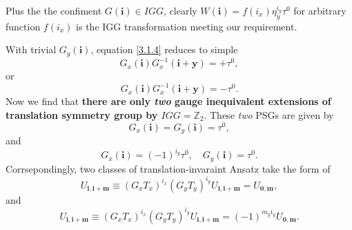 \documentclass[10pt,nofootinbib]{revtex4}
\begin{document}
		Plus the the confiment $G(\bm{i})\in IGG$, clearly $W(\bm{i})=f(i_x)\eta_y^{i_y}\tau^0$ for arbitrary function $f(i_x)$ is the IGG transformation meeting our requirement.\par
		With trivial $G_y(\bm{i})$, equation \eqref{3.1.4} reduces to simple
		\begin{equation*}
			G_x(\bm{i})G_x^{-1}(\bm{i+y})=+\tau^0,
		\end{equation*}
		or
		\begin{equation*}
			G_x(\bm{i})G_x^{-1}(\bm{i+y})=-\tau^0.
		\end{equation*}
		Now we find that \textbf{there are only \emph{two} gauge inequivalent extensions of translation symmetry group by $IGG=\mathbb{Z}_2$}. These \emph{two} PSGs are given by
		\begin{equation}\label{3.1.6}
			G_x(\bm{i})=G_y(\bm{i})=\tau^0,
		\end{equation}
		and
		\begin{equation}\label{3.1.7}
			G_x(\bm{i})=(-1)^{i_y}\tau^0,\quad G_y(\bm{i})=\tau^0.
		\end{equation}
		\indent Corrsepondingly, two classes of translation-invaraint Ansatz take the form of
		\begin{equation}\label{3.1.8}
			U_{\bm{i,i+m}}\equiv(G_xT_x)^{i_x}(G_yT_y)^{i_y}U_{\bm{i,i+m}}= U_{\bm{0,m}},
		\end{equation}
		and
		\begin{equation}\label{3.1.9}
			U_{\bm{i,i+m}}\equiv(G_xT_x)^{i_x}(G_yT_y)^{i_y}U_{\bm{i,i+m}}= (-1)^{m_yi_y}U_{\bm{0,m}}.
		\end{equation}
\end{document}
